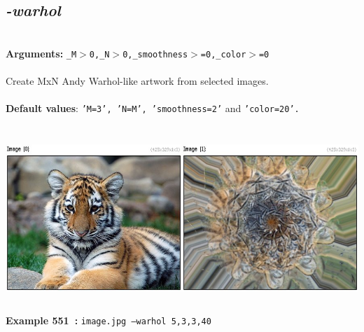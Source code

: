 \documentclass[a4paper,11pt,twoside]{book}
\begin{document}
\subsection{\emph{-warhol} }\vspace*{-0.5em}
~\\\textbf{Arguments: } 
{\small \texttt{\_M$>$0,\_N$>$0,\_smoothness$>$=0,\_color$>$=0}}\\~\\
Create MxN Andy Warhol-like artwork from selected images.
~\\~\\\textbf{Default values}: {\small \texttt{'M=3', 'N=M', 'smoothness=2'} and \texttt{'color=20'.}}
\begin{center}\includegraphics[keepaspectratio=true,height=7cm,width=\textwidth]{img/gmic_def551.jpg}\\
{\footnotesize \textbf{Example 551~:} \texttt{image.jpg --warhol 5,3,3,40}}
\end{center}
\end{document}
